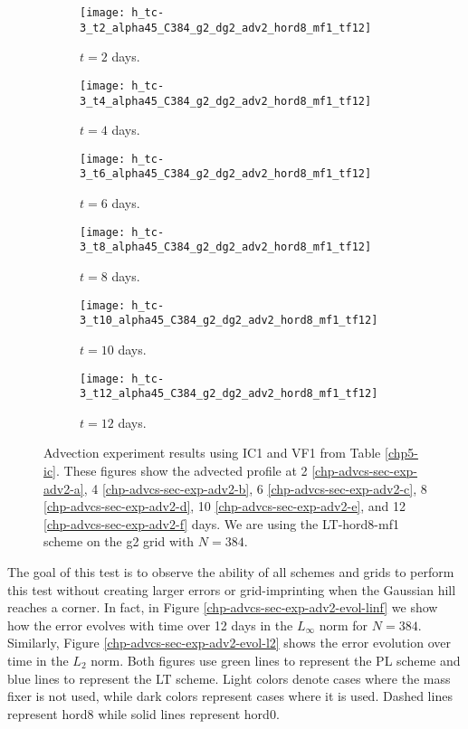 \begin{figure}[!htb]
	\centering
	\begin{subfigure}{0.45\textwidth}
		\centering
		\texttt{[image: h\_tc-3\_t2\_alpha45\_C384\_g2\_dg2\_adv2\_hord8\_mf1\_tf12]}
		\caption{$t=2$ days.\label{chp-advcs-sec-exp-adv2-a}}
	\end{subfigure}
	\begin{subfigure}{0.45\textwidth}
		\centering
		\texttt{[image: h\_tc-3\_t4\_alpha45\_C384\_g2\_dg2\_adv2\_hord8\_mf1\_tf12]}
		\caption{$t=4$ days.\label{chp-advcs-sec-exp-adv2-b}}
	\end{subfigure}

	\begin{subfigure}{0.45\textwidth}
		\centering
		\texttt{[image: h\_tc-3\_t6\_alpha45\_C384\_g2\_dg2\_adv2\_hord8\_mf1\_tf12]}
		\caption{$t=6$ days.\label{chp-advcs-sec-exp-adv2-c}}
	\end{subfigure}	
	\begin{subfigure}{0.45\textwidth}
		\centering
		\texttt{[image: h\_tc-3\_t8\_alpha45\_C384\_g2\_dg2\_adv2\_hord8\_mf1\_tf12]}
		\caption{$t=8$ days.\label{chp-advcs-sec-exp-adv2-d}}
	\end{subfigure}

	\begin{subfigure}{0.45\textwidth}
		\centering
		\texttt{[image: h\_tc-3\_t10\_alpha45\_C384\_g2\_dg2\_adv2\_hord8\_mf1\_tf12]}
		\caption{$t=10$ days.\label{chp-advcs-sec-exp-adv2-e}}
	\end{subfigure}
	\begin{subfigure}{0.45\textwidth}
		\centering
		\texttt{[image: h\_tc-3\_t12\_alpha45\_C384\_g2\_dg2\_adv2\_hord8\_mf1\_tf12]}
		\caption{$t=12$ days.\label{chp-advcs-sec-exp-adv2-f}}
	\end{subfigure}
	\caption{Advection experiment  results using IC1 and VF1 from Table \ref{chp5-ic}.
		These figures show the advected profile at
		2 \eqref{chp-advcs-sec-exp-adv2-a}, 
		4  \eqref{chp-advcs-sec-exp-adv2-b},
		6  \eqref{chp-advcs-sec-exp-adv2-c},
		8  \eqref{chp-advcs-sec-exp-adv2-d},
		10  \eqref{chp-advcs-sec-exp-adv2-e},
		and 12  \eqref{chp-advcs-sec-exp-adv2-f} days.
		We are using the LT-hord8-mf1 scheme on the g2 grid with $N=384$. \label{chp-advcs-sec-exp-adv2}}
\end{figure}

The goal of this test is to observe the ability of all schemes and grids to perform this test without creating
larger errors or grid-imprinting when the Gaussian hill reaches a corner.
In fact, in Figure \ref{chp-advcs-sec-exp-adv2-evol-linf} we show how the error evolves with time over 12 days in the $L_{\infty}$ norm for $N=384$.
Similarly, Figure \ref{chp-advcs-sec-exp-adv2-evol-l2} shows the error evolution over time in the $L_2$ norm.
Both figures use green lines to represent the PL scheme and blue lines to represent the LT scheme.
Light colors denote cases where the mass fixer is not used, while dark colors represent cases where it is used. 
Dashed lines represent hord8 while solid lines represent hord0.

